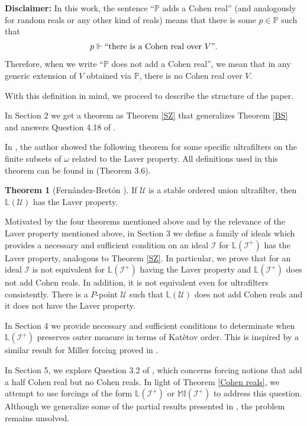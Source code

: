 \documentclass{amsart}
\theoremstyle{definition}
\newtheorem{theorem}{Theorem}[section]
\theoremstyle{remark}
\numberwithin{equation}{section}
\newcommand{\li}{\mathbb{L}(\mathcal{I}^+)}
\newcommand{\lav}{\mathbb{L}}
\newcommand{\mil}{\mathbb{MI}}
\newcommand{\id}{\mathcal{I}}
\begin{document}
\textbf{Disclaimer:} In this work, the sentence “$\mathbb{P}$ adds a Cohen real” (and analogously for random reals or any other kind of reals) means that there is some $p\in\mathbb{P}$ such that 
\[
p\Vdash ``\text{there is a Cohen real over }V".
\]
Therefore, when we write “$\mathbb{P}$ does not add a Cohen real”, we mean that in any generic extension of $V$ obtained via $\mathbb{P}$, there is no Cohen real over $V$.

With this definition in mind, we proceed to describe the structure of the paper.

In Section 2 we get a theorem as Theorem \ref{SZ} that generalizes Theorem \ref{BS} and answers Question 4.18 of \cite{poke}.

In \cite{fernandez}, the author showed the following theorem for some specific ultrafilters on the finite subsets of $\omega$ related to the Laver property. All definitions used in this theorem can be found in \cite{fernandez} (Theorem 3.6). 

\begin{theorem}[Fernández-Bretón \cite{fernandez}]\label{breton}
    If $\mathcal{U}$ is a stable ordered union ultrafilter, then $\lav(\mathcal{U})$ has the Laver property.
\end{theorem}

Motivated by the four theorems mentioned above and by the relevance of the Laver property mentioned above, in Section 3 we define a family of ideals which provides a necessary and sufficient condition on an ideal $\id$ for $\li$ has the Laver property, analogous to Theorem \ref{SZ}. In particular, we prove that for an ideal $\id$ is not equivalent for $\li$ having the Laver property and $\li$ does not add Cohen reals. In addition, it is not equivalent even for ultrafilters consistently. There is a $P$-point $\mathcal{U}$ such that $\lav(\mathcal{U})$ does not add Cohen reals and it does not have the Laver property.

In Section 4 we provide necessary and sufficient conditions to determinate when $\li$ preserves outer measure in terms of Kat\v{e}tov order. This is inspired by a similar result for Miller forcing proved in \cite{sabok}.

In Section 5, we explore Question 3.2 of \cite{hc}, which concerns forcing notions that add a half Cohen real but no Cohen reals. In light of Theorem \ref{Cohen reals}, we attempt to use forcings of the form $\li$ or $\mil(\id^+)$ to address this question. Although we generalize some of the partial results presented in \cite{fullmil}, the problem remains unsolved.
\end{document}
